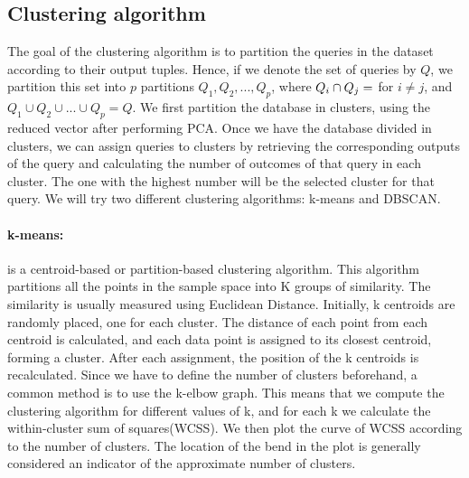\documentclass[sigconf]{acmart}
\begin{document}
\subsection{Clustering algorithm}
The goal of the clustering algorithm is to partition the queries in the dataset according to their output tuples. Hence, if we denote the set of queries by $Q$, we partition this set into $p$ partitions $Q_1,Q_2,..., Q_p$, where $Q_i \cap Q_j = \empty$ for $i \neq j$, and $ Q_1 \cup Q_2 \cup ... \cup Q_p = Q$. We first partition the database in clusters, using the reduced vector after performing PCA. Once we have the database divided in clusters, we can assign queries to clusters by retrieving the corresponding outputs of the query and calculating the number of outcomes of that query in each cluster. The one with the highest number will be the selected cluster for that query.  We will try two different clustering algorithms: k-means and DBSCAN.

\paragraph{k-means:} is a centroid-based or partition-based clustering algorithm. This algorithm partitions all the points in the sample space into K groups of similarity. The similarity is usually measured using Euclidean Distance. Initially, k centroids are randomly placed, one for each cluster. The distance of each point from each centroid is calculated, and each data point is assigned to its closest centroid, forming a cluster. After each assignment, the position of the k centroids is recalculated. Since we have to define the number of clusters beforehand, a common method is to use the k-elbow graph. This means that we compute the clustering algorithm for different values of k, and for each k we calculate the within-cluster sum of squares(WCSS). We then plot the curve of WCSS according to the number of clusters. The location of the bend in the plot is generally considered an indicator of the approximate number of clusters.
\end{document}
